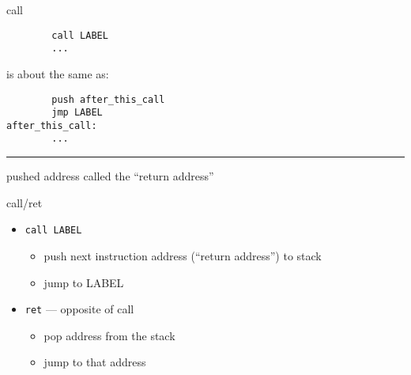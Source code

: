 \begin{frame}[fragile,label=callExpand]{call}
\begin{lstlisting}
        call LABEL
        ...
\end{lstlisting}
{\large is about the same as:}
\begin{lstlisting}
        push after_this_call
        jmp LABEL
after_this_call:
        ...
\end{lstlisting}
\hrule
\large pushed address called the ``return address''
\end{frame}

\begin{frame}[fragile,label=retExpand]{call/ret}
\begin{itemize}
\item \texttt{call LABEL} 
    \begin{itemize}
    \item push next instruction address (``return address'') to stack
    \item jump to LABEL
    \end{itemize}
\item \texttt{ret} --- opposite of call
    \begin{itemize}
    \item pop address from the stack
    \item jump to that address
    \end{itemize}
\end{itemize}
\end{frame}
